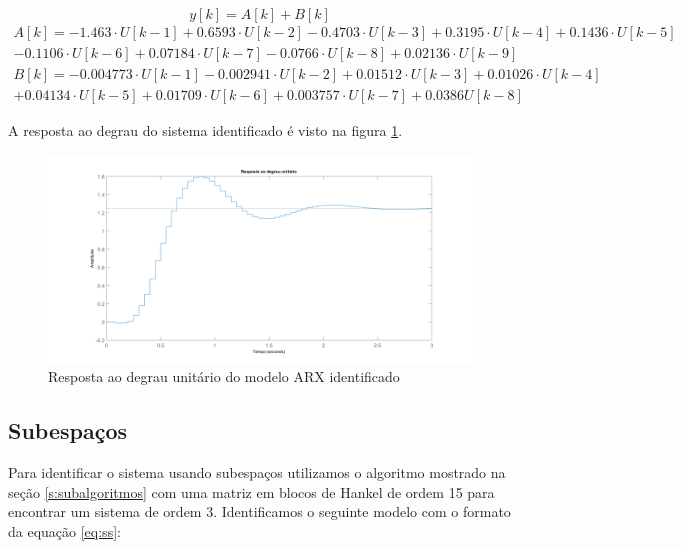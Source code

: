 \begin{equation}
y[k]= A[k]+ B[k] 
\end{equation}
\begin{equation}
\begin{aligned}
A[k]=- 1.463\cdot U[k-1] + 0.6593 \cdot U[k-2] - 0.4703\cdot U[k-3] + 0.3195\cdot U[k-4] + 0.1436\cdot U[k-5]\\- 0.1106\cdot U[k-6] + 0.07184 \cdot U[k-7] - 0.0766\cdot U[k-8] + 0.02136 \cdot U[k-9]
\end{aligned}
\end{equation}
\begin{equation}
\begin{aligned}
B[k]=-0.004773\cdot U[k-1] - 0.002941\cdot U[k-2] + 0.01512\cdot U[k-3] + 0.01026\cdot U[k-4]\\ + 0.04134\cdot U[k-5] + 0.01709\cdot U[k-6] + 0.003757\cdot U[k-7]   + 0.0386 U[k-8]
\end{aligned}
\end{equation}

A resposta ao degrau do sistema identificado é visto na figura \ref{fig:respostadegrauarx}.

\begin{figure}[H]
	\centering
	\includegraphics[width=1\linewidth]{respostadegrauarx}
	\caption[Resposta ao degrau do modelo ARX]{Resposta ao degrau unitário do modelo ARX identificado}
	\label{fig:respostadegrauarx}
\end{figure}

\subsection{Subespaços}\label{s:4estsub}

Para identificar o sistema usando subespaços utilizamos o algoritmo mostrado na seção \ref{s:subalgoritmos} com uma matriz em blocos de Hankel de ordem 15 para encontrar um sistema de ordem 3. Identificamos o seguinte modelo com o formato da equação \ref{eq:ss}:

